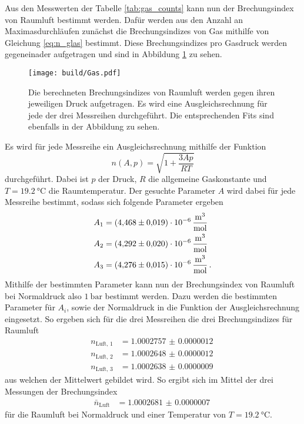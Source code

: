 \FloatBarrier
Aus den Messwerten der Tabelle \ref{tab:gas_counts} kann nun der Brechungsindex von Raumluft bestimmt werden.
Dafür werden aus den Anzahl an Maximasdurchläufen zunächst die Brechungsindizes von Gas mithilfe von Gleichung \eqref{eq:n_glas} bestimmt.
Diese Brechungsindizes pro Gasdruck werden gegeneinader aufgetragen und sind in Abbildung \ref{fig:n_glass} zu sehen.
\begin{figure}
    \centering 
    \texttt{[image: build/Gas.pdf]}
    \caption{Die berechneten Brechungsindizes von Raumluft werden gegen ihren jeweiligen Druck aufgetragen.
    Es wird eine Ausgleichsrechnung für jede der drei Messreihen durchgeführt.
    Die entsprechenden Fits sind ebenfalls in der Abbildung zu sehen.}
    \label{fig:n_glass}
\end{figure}
Es wird für jede Messreihe ein Ausgleichsrechnung mithilfe der Funktion
\begin{equation*}
    n(A,p) =  \sqrt{1 + \frac{3Ap}{RT}}
\end{equation*}
durchgeführt.
Dabei ist $p$ der Druck, $R$ die allgemeine Gaskonstante und $T=\SI{19.2}{\celsius}$ die Raumtemperatur.
Der gesuchte Parameter $A$ wird dabei für jede Messreihe bestimmt, sodass sich folgende Parameter ergeben
\begin{align*}
    A_1 &= \SI{4.468(19)e-6}{\frac{\cubic\meter}{\mol}} \\
    A_2 &= \SI{4.292(20)e-6}{\frac{\cubic\meter}{\mol}} \\
    A_3 &= \SI{4.276(15)e-6}{\frac{\cubic\meter}{\mol}} \, .
\end{align*}
Mithilfe der bestimmten Parameter kann nun der Brechungsindex von Raumluft bei Normaldruck also $\SI{1}{\bar}$ bestimmt werden.
Dazu werden die bestimmten Parameter für $A_i$, sowie der Normaldruck in die Funktion der Ausgleichsrechnung eingesetzt.
So ergeben sich für die drei Messreihen die drei Brechungsindizes für Raumluft
\begin{align*}
    n_\text{Luft, 1} &= \SI{1.0002757(12)}{}\\
    n_\text{Luft, 2} &= \SI{1.0002648(12)}{}\\
    n_\text{Luft, 3} &= \SI{1.0002638(09)}{}
\end{align*}
aus welchen der Mittelwert gebildet wird.
So ergibt sich im Mittel der drei Messungen der Brechungsindex
\begin{align*}
    \bar{n}_\text{Luft} &= \SI{1.0002681(07)}{}
\end{align*}
für die Raumluft bei Normaldruck und einer Temperatur von $T=\SI{19.2}{\celsius}$.
